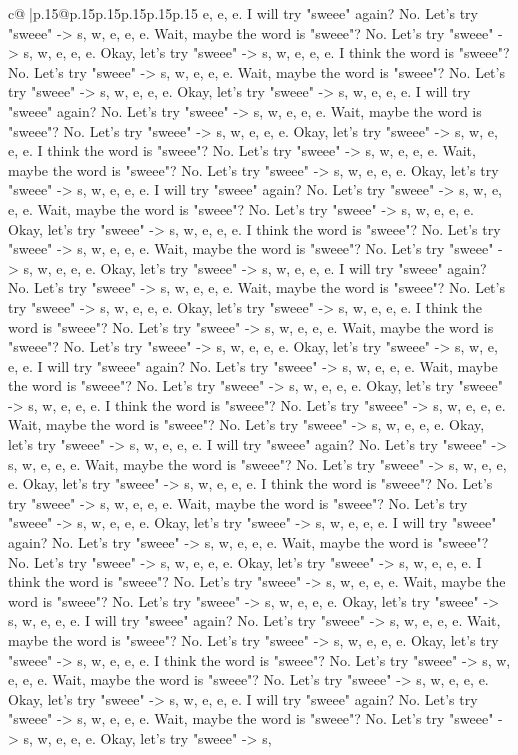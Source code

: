\documentclass{article}
\begin{document}
{\begin{supertabular}{c@{$\;$}|p{.15\linewidth}@{}p{.15\linewidth}p{.15\linewidth}p{.15\linewidth}p{.15\linewidth}p{.15\linewidth}}
{{{e, e, e. I will try "sweee" again? No. Let's try "sweee" {-}> s, w, e, e, e. Wait, maybe the word is "sweee"? No. Let's try "sweee" {-}> s, w, e, e, e. Okay, let's try "sweee" {-}> s, w, e, e, e. I think the word is "sweee"? No. Let's try "sweee" {-}> s, w, e, e, e. Wait, maybe the word is "sweee"? No. Let's try "sweee" {-}> s, w, e, e, e. Okay, let's try "sweee" {-}> s, w, e, e, e. I will try "sweee" again? No. Let's try "sweee" {-}> s, w, e, e, e. Wait, maybe the word is "sweee"? No. Let's try "sweee" {-}> s, w, e, e, e. Okay, let's try "sweee" {-}> s, w, e, e, e. I think the word is "sweee"? No. Let's try "sweee" {-}> s, w, e, e, e. Wait, maybe the word is "sweee"? No. Let's try "sweee" {-}> s, w, e, e, e. Okay, let's try "sweee" {-}> s, w, e, e, e. I will try "sweee" again? No. Let's try "sweee" {-}> s, w, e, e, e. Wait, maybe the word is "sweee"? No. Let's try "sweee" {-}> s, w, e, e, e. Okay, let's try "sweee" {-}> s, w, e, e, e. I think the word is "sweee"? No. Let's try "sweee" {-}> s, w, e, e, e. Wait, maybe the word is "sweee"? No. Let's try "sweee" {-}> s, w, e, e, e. Okay, let's try "sweee" {-}> s, w, e, e, e. I will try "sweee" again? No. Let's try "sweee" {-}> s, w, e, e, e. Wait, maybe the word is "sweee"? No. Let's try "sweee" {-}> s, w, e, e, e. Okay, let's try "sweee" {-}> s, w, e, e, e. I think the word is "sweee"? No. Let's try "sweee" {-}> s, w, e, e, e. Wait, maybe the word is "sweee"? No. Let's try "sweee" {-}> s, w, e, e, e. Okay, let's try "sweee" {-}> s, w, e, e, e. I will try "sweee" again? No. Let's try "sweee" {-}> s, w, e, e, e. Wait, maybe the word is "sweee"? No. Let's try "sweee" {-}> s, w, e, e, e. Okay, let's try "sweee" {-}> s, w, e, e, e. I think the word is "sweee"? No. Let's try "sweee" {-}> s, w, e, e, e. Wait, maybe the word is "sweee"? No. Let's try "sweee" {-}> s, w, e, e, e. Okay, let's try "sweee" {-}> s, w, e, e, e. I will try "sweee" again? No. Let's try "sweee" {-}> s, w, e, e, e. Wait, maybe the word is "sweee"? No. Let's try "sweee" {-}> s, w, e, e, e. Okay, let's try "sweee" {-}> s, w, e, e, e. I think the word is "sweee"? No. Let's try "sweee" {-}> s, w, e, e, e. Wait, maybe the word is "sweee"? No. Let's try "sweee" {-}> s, w, e, e, e. Okay, let's try "sweee" {-}> s, w, e, e, e. I will try "sweee" again? No. Let's try "sweee" {-}> s, w, e, e, e. Wait, maybe the word is "sweee"? No. Let's try "sweee" {-}> s, w, e, e, e. Okay, let's try "sweee" {-}> s, w, e, e, e. I think the word is "sweee"? No. Let's try "sweee" {-}> s, w, e, e, e. Wait, maybe the word is "sweee"? No. Let's try "sweee" {-}> s, w, e, e, e. Okay, let's try "sweee" {-}> s, w, e, e, e. I will try "sweee" again? No. Let's try "sweee" {-}> s, w, e, e, e. Wait, maybe the word is "sweee"? No. Let's try "sweee" {-}> s, w, e, e, e. Okay, let's try "sweee" {-}> s, w, e, e, e. I think the word is "sweee"? No. Let's try "sweee" {-}> s, w, e, e, e. Wait, maybe the word is "sweee"? No. Let's try "sweee" {-}> s, w, e, e, e. Okay, let's try "sweee" {-}> s, w, e, e, e. I will try "sweee" again? No. Let's try "sweee" {-}> s, w, e, e, e. Wait, maybe the word is "sweee"? No. Let's try "sweee" {-}> s, w, e, e, e. Okay, let's try "sweee" {-}> s, }}}
\end{supertabular}}
\end{document}
